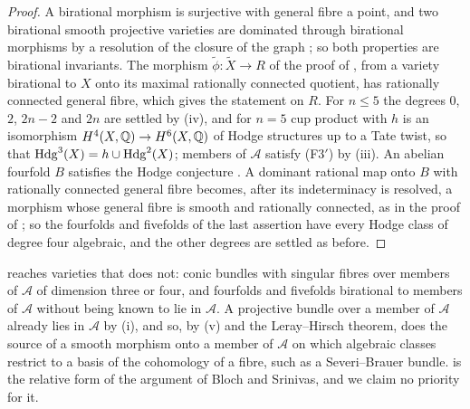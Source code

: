 \begin{proof}
A birational morphism is surjective with general fibre a point, and two
birational smooth projective varieties are dominated through birational
morphisms by a resolution of the closure of the graph \cite{Hir64}; so both
properties are birational invariants. The morphism
$\widetilde\phi\colon\widetilde X\to R$ of the proof of
, from a variety birational to $X$ onto its maximal
rationally connected quotient, has rationally connected general fibre,
which gives the statement on $R$. For $n\le5$ the degrees $0$, $2$, $2n-2$
and $2n$ are settled by (iv), and for $n=5$ cup product
with $h$ is an isomorphism $H^{4}(X,\mathbb{Q})\to H^{6}(X,\mathbb{Q})$ of Hodge structures
up to a Tate twist, so that $\mathrm{Hdg}^{3}(X)=h\cup\mathrm{Hdg}^{2}(X)$; members of
$\mathcal{A}$ satisfy \textup{(F3$'$)} by (iii). An
abelian fourfold $B$ satisfies the Hodge conjecture \cite{Mar25a,Mar25b}. A
dominant rational map onto $B$ with rationally connected general fibre
becomes, after its indeterminacy is resolved, a morphism whose general fibre
is smooth and rationally connected, as in the proof of
; so the fourfolds and fivefolds of the last
assertion have every Hodge class of degree four algebraic, and the other
degrees are settled as before.
\end{proof}

 reaches varieties that 
does not: conic bundles with singular fibres over members of $\mathcal{A}$ of
dimension three or four, and fourfolds and fivefolds birational to members
of $\mathcal{A}$ without being known to lie in $\mathcal{A}$. A projective
bundle over a member of $\mathcal{A}$ already lies in $\mathcal{A}$ by
(i), and so, by (v) and the
Leray--Hirsch theorem, does the source of a smooth morphism onto a member of
$\mathcal{A}$ on which algebraic classes restrict to a basis of the
cohomology of a fibre, such as a Severi--Brauer bundle.
 is the relative form of the argument of Bloch
and Srinivas, and we claim no priority for it.

